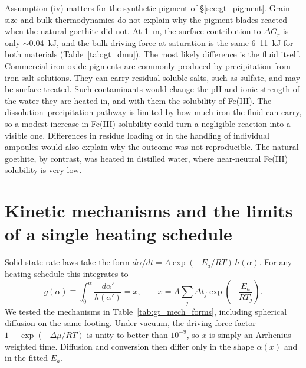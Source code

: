 Assumption (iv) matters for the synthetic pigment of \S\ref{sec:gt_pigment}. Grain size and bulk
thermodynamics do not explain why the pigment blades reacted when the natural goethite did not. At 1~\textmu m, the surface contribution to $\Delta G_r$ is only
$\sim$0.04~kJ, and the bulk driving force at saturation is the same 6--11~kJ for both materials
(Table~\ref{tab:gt_dmu}). The most likely difference is the fluid itself. Commercial iron-oxide
pigments are commonly produced by precipitation from iron-salt solutions. They can carry
residual soluble salts, such as sulfate, and may be surface-treated. Such contaminants would
change the pH and ionic strength of the water they are heated in, and with them the solubility
of Fe(III). The dissolution--precipitation pathway is limited by how much iron the fluid can
carry, so a modest increase in Fe(III) solubility could turn a negligible reaction into a
visible one. Differences in residue loading or in the handling of individual ampoules would also
explain why the outcome was not reproducible. The natural goethite, by contrast, was heated in
distilled water, where near-neutral Fe(III) solubility is very low.


\clearpage




\section{Kinetic mechanisms and the limits of a single heating schedule}
\label{sec:gt_supp_mech}

Solid-state rate laws take the form $d\alpha/dt = A\exp(-E_a/RT)\,h(\alpha)$. For any heating
schedule this integrates to
\begin{equation}
  g(\alpha) \equiv \int_0^{\alpha}\frac{d\alpha'}{h(\alpha')} = x,
  \qquad
  x = A\sum_j \Delta t_j\exp\!\left(-\frac{E_a}{RT_j}\right).
\end{equation}
We tested the mechanisms in Table~\ref{tab:gt_mech_forms}, including spherical diffusion on the
same footing. Under vacuum, the driving-force factor $1-\exp(-\Delta\mu/RT)$ is unity to better
than $10^{-9}$, so $x$ is simply an Arrhenius-weighted time. Diffusion and conversion then
differ only in the shape $\alpha(x)$ and in the fitted $E_a$.

